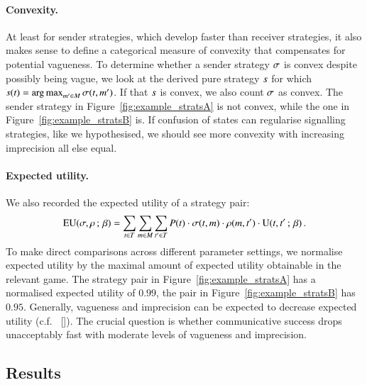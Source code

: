 \documentclass[12pt,english]{article}
\newcommand{\toler}{\ensuremath{\beta}} %
\renewcommand{\Pr}{\ensuremath{P}}
\numberwithin{equation}{section}
\newcommand{\citepbjpspre}[2]{(#1~\citeauthor{#2} [\citeyear{#2}])}
\begin{document}
\paragraph{Convexity.} At least for sender strategies, which develop faster than receiver
strategies, it also makes sense to define a categorical measure of convexity that compensates
for potential vagueness. To determine whether a sender strategy $\sigma$ is convex despite
possibly being vague, we look at the derived pure strategy $s$ for which
$s(t) = \operatorname*{arg\,max}_{m' \in M} \sigma(t,m')$. If that $s$ is
convex, we also count $\sigma$ as convex. The sender strategy in
Figure~\ref{fig:example_stratsA} is not convex, while the one in
Figure~\ref{fig:example_stratsB} is.  If confusion of states can regularise signalling
strategies, like we hypothesised, we should see more convexity with increasing imprecision all
else equal.

\paragraph{Expected utility.} We also recorded the expected utility of
a strategy pair:
\begin{align*}
  \EU(\Sstrat,\Rstrat \myts ; \myts \toler) = \sum_{\state \in
    \States} \sum_{\messg \in \Messgs} \sum_{\state' \in \States}
  \Pr(\state) \cdot \Sstrat(\state, \messg) \cdot \Rstrat(\messg,
  \state') \cdot \Util(\state,\state' \myts ; \myts \toler)\,.
\end{align*}
To make direct comparisons across different parameter settings, we
normalise expected utility by the maximal amount of expected utility
obtainable in the relevant game. The strategy pair in
Figure~\ref{fig:example_stratsA} has a normalised expected utility of
$0.99$, the pair in Figure~\ref{fig:example_stratsB} has
$0.95$. Generally, vagueness and imprecision can be expected to
decrease expected utility
\citepbjpspre{c.f.}{Lipman2009:Why-is-Language}. The crucial question is
whether communicative success drops unacceptably fast with moderate
levels of vagueness and imprecision.

\subsection{Results}
\end{document}
